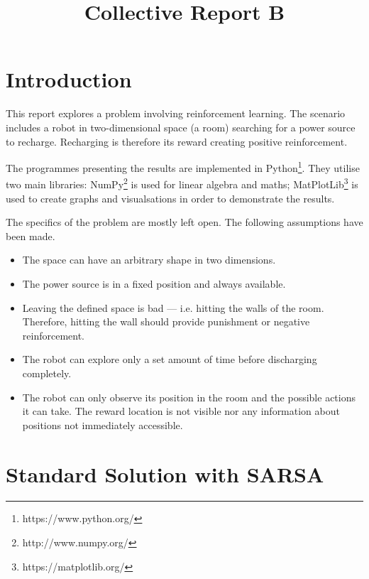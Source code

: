 \documentclass[11pt,journal,transmag,final]{IEEEtran}
\begin{document}
    \title{Collective Report B}
    \author{
    }

    \maketitle

    \section{Introduction}

    This report explores a problem involving reinforcement learning. The scenario includes a robot in two-dimensional space (a room) searching for a power source to recharge. Recharging is therefore its reward creating positive reinforcement.

    The programmes presenting the results are implemented in Python\footnote{https://www.python.org/}. They utilise two main libraries: NumPy\footnote{http://www.numpy.org/} is used for linear algebra and maths; MatPlotLib\footnote{https://matplotlib.org/} is used to create graphs and visualsations in order to demonstrate the results.

    The specifics of the problem are mostly left open. The following assumptions have been made.

    \begin{itemize}
        \item The space can have an arbitrary shape in two dimensions.
        \item The power source is in a fixed position and always available.
        \item Leaving the defined space is bad --- i.e. hitting the walls of the room. Therefore, hitting the wall should provide punishment or negative reinforcement.
        \item The robot can explore only a set amount of time before discharging completely.
        \item The robot can only observe its position in the room and the possible actions it can take. The reward location is not visible nor any information about positions not immediately accessible.
    \end{itemize}

    \section{Standard Solution with SARSA}
    \label{sec:standard-sarsa}
\end{document}
